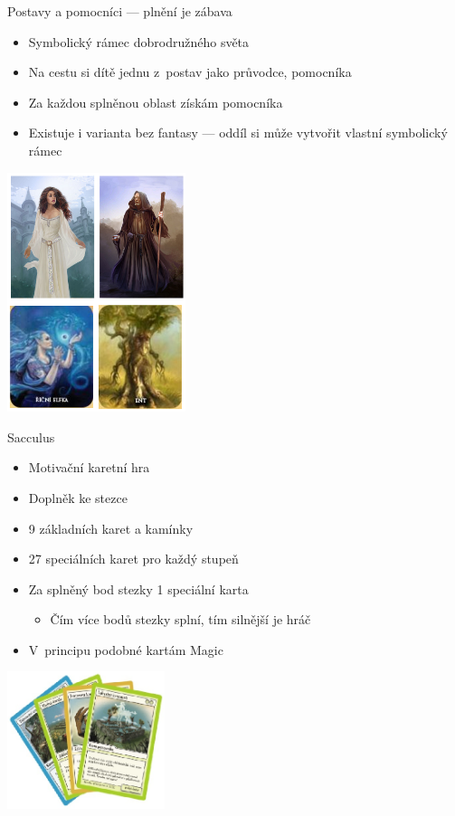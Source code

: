 \documentclass[compress,xelatex,xcolor=dvipsnames,hyperref={pdfpagelabels=false},print]{beamer}
\begin{document}
\begin{frame}{Postavy a pomocníci --- plnění je zábava}
\begin{multicols}{2}
\begin{itemize}
\item Symbolický rámec dobrodružného světa
\item Na cestu si dítě jednu z~postav jako průvodce, pomocníka
\item Za každou splněnou oblast získám pomocníka
\item Existuje i varianta bez fantasy --- oddíl si může vytvořit vlastní symbolický rámec
\end{itemize}
\columnbreak
\includegraphics[height=7cm]{postavy.png}
\end{multicols}
\end{frame}

\begin{frame}{Sacculus}
\begin{multicols}{2}
\begin{itemize}
\item Motivační karetní hra
\item Doplněk ke stezce
\item 9 základních karet a kamínky
\item 27 speciálních karet pro každý stupeň
\item Za splněný bod stezky 1 speciální karta
\begin{itemize}
 \item Čím více bodů stezky splní, tím silnější je hráč
\end{itemize}
\item V~principu podobné kartám Magic
\end{itemize}
\columnbreak
\includegraphics[height=4cm]{sacculus.png}
\end{multicols}
\end{frame}
\end{document}
